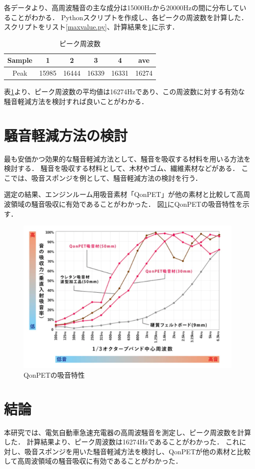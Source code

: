 \documentclass[dvipdfmx,titlepage,a4j]{jsarticle}  %
\begin{document}
各データより、高周波騒音の主な成分は15000Hzから20000Hzの間に分布していることがわかる．
Pythonスクリプトを作成し、各ピークの周波数を計算した．スクリプトをリスト\ref{maxvalue.py}、計算結果を\ref{table: peak}に示す．



\begin{table}[H]
  \centering
  \caption{ピーク周波数}
  \label{table: peak}
  \begin{tabular}{c|c|c|c|c|c}
    \hline\hline
    Sample & 1 & 2 & 3 & 4 & ave\\
    \hline
    Peak & 15985 & 16444 & 16339 & 16331 & 16274\\
    \hline
  \end{tabular}
\end{table}

表\ref{table: peak}より、ピーク周波数の平均値は16274Hzであり、この周波数に対する有効な騒音軽減方法を検討すれば良いことがわかる．

\section{騒音軽減方法の検討}
最も安価かつ効果的な騒音軽減方法として、騒音を吸収する材料を用いる方法を検討する．
騒音を吸収する材料として、木材やゴム、繊維素材などがある．
ここでは、吸音スポンジを例として、騒音軽減方法の検討を行う．

選定の結果、エンジンルーム用吸音素材「QonPET」が他の素材と比較して高周波領域の騒音吸収に有効であることがわかった．
図\ref{fig:qonpet}にQonPETの吸音特性を示す．\cite{online}

\begin{figure}[H]
  \centering
  \includegraphics[width=0.5\linewidth]{../picture/qonpet.png}
  \caption{QonPETの吸音特性}
  \label{fig:qonpet}
\end{figure}

\section{結論}
本研究では、電気自動車急速充電器の高周波騒音を測定し、ピーク周波数を計算した．
計算結果より、ピーク周波数は16274Hzであることがわかった．
これに対し、吸音スポンジを用いた騒音軽減方法を検討し、QonPETが他の素材と比較して高周波領域の騒音吸収に有効であることがわかった．
\end{document}
